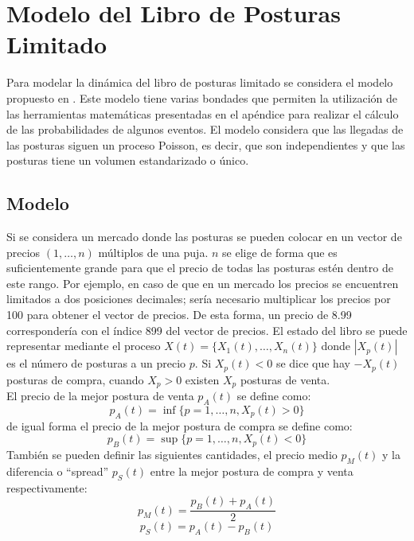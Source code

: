 \documentclass[11pt]{article}
\numberwithin{equation}{section} %
\begin{document}
\clearpage

\section{Modelo del Libro de Posturas Limitado}

Para modelar la dinámica del libro de posturas limitado se considera el modelo propuesto en \cite{Cont2010}. Este modelo tiene varias bondades que permiten la utilización de las herramientas matemáticas presentadas en el apéndice para realizar el cálculo de las probabilidades de algunos eventos. El modelo considera que las llegadas de las posturas siguen un proceso Poisson, es decir, que son independientes y que las posturas tiene un volumen estandarizado o único.\\

\subsection{Modelo}

Si se considera un mercado donde las posturas se pueden colocar en un vector de precios $\left(1,\ldots,n\right)$ múltiplos de una puja. $n$ se elige de forma que es suficientemente grande para que el precio de todas las posturas estén dentro de este rango. Por ejemplo, en caso de que en un mercado los precios se encuentren limitados a dos posiciones decimales; sería necesario multiplicar los precios por 100 para obtener el vector de precios. De esta forma, un precio de 8.99 correspondería con el índice 899 del vector de precios. El estado del libro se puede representar mediante el proceso $X(t)=\{X_1(t),\ldots,X_n(t)\}$ donde $|X_p(t)|$ es el número de posturas a un precio $p$. Si $X_p(t)<0$ se dice que hay $-X_p(t)$ posturas de compra, cuando $X_p>0$ existen $X_p$ posturas de venta.\\

El precio de la mejor postura de venta $p_A(t)$ se define como:
\[
p_A(t)= \inf\{p=1,\ldots,n,X_p(t)>0\}
\]
de igual forma el precio de la mejor postura de compra se define como:
\[
p_B(t)= \sup\{p=1,\ldots,n,X_p(t)<0\}
\]
También se pueden definir las siguientes cantidades, el precio medio $p_M(t)$ y la diferencia o ``spread'' $p_S(t)$ entre la mejor postura de compra y venta respectivamente:
\[
p_M(t)=\frac{p_B(t)+p_A(t)}{2}
\]
\[
p_S(t)=p_A(t)-p_B(t)
\]\\
\end{document}
